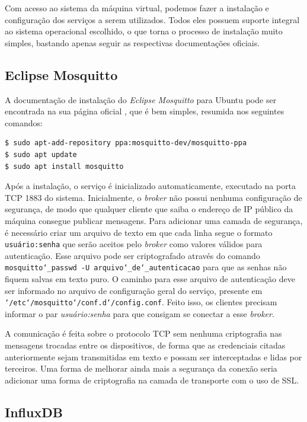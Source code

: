 \documentclass[../monografia.tex]{subfiles}
\begin{document}
Com acesso ao sistema da máquina virtual, podemos fazer a instalação e configuração dos serviços a serem utilizados. Todos eles possuem suporte integral ao sistema operacional escolhido, o que torna o processo de instalação muito simples, bastando apenas seguir as respectivas documentações oficiais. 


\subsection{Eclipse Mosquitto}

A documentação de instalação do \textit{Eclipse Mosquitto} para Ubuntu pode ser encontrada na sua página oficial \cite{mosquitto}, que é bem simples, resumida nos seguintes comandos:

\begin{lstlisting}[language=bash, basicstyle=\ttfamily]
$ sudo apt-add-repository ppa:mosquitto-dev/mosquitto-ppa
$ sudo apt update
$ sudo apt install mosquitto
\end{lstlisting}

Após a instalação, o serviço é inicializado automaticamente, executado na porta TCP 1883 do sistema. Inicialmente, o \textit{broker} não possui nenhuma configuração de segurança, de modo que qualquer cliente que saiba o endereço de IP público da máquina consegue publicar mensagens. Para adicionar uma camada de segurança, é necessário criar um arquivo de texto em que cada linha segue o formato \texttt{usuário:senha} que serão aceitos pelo \textit{broker} como valores válidos para autenticação. Esse arquivo pode ser criptografado através do comando \texttt{mosquitto\char`_passwd -U arquivo\char`_de\char`_autenticacao} para que as senhas não fiquem salvas em texto puro. O caminho para esse arquivo de autenticação deve ser informado no arquivo de configuração geral do serviço, presente em \texttt{\char`/etc\char`/mosquitto\char`/conf.d\char`/config.conf}. Feito isso, os clientes precisam informar o par \textit{usuário:senha} para que consigam se conectar a esse \textit{broker}.

A comunicação é feita sobre o protocolo TCP sem nenhuma criptografia nas mensagens trocadas entre os dispositivos, de forma que as credenciais citadas anteriormente sejam transmitidas em texto e possam ser interceptadas e lidas por terceiros. Uma forma de melhorar ainda mais a segurança da conexão seria adicionar uma forma de criptografia na camada de transporte com o uso de SSL.

\subsection{InfluxDB}
\end{document}
